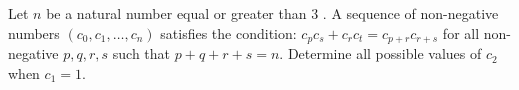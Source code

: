 Let $ n$ be a natural number equal or greater than 3 . A sequence of non-negative numbers  $ (c_0,c_1,\ldots,c_n)$ satisfies the condition: $ c_{p}c_{s}+c_{r}c_{t}= c_{p+r}c_{r+s}$ for all non-negative $ p,q,r,s$ such that $ p+q+r+s=n$. Determine all possible values of $ c_2$ when $ c_1=1$.